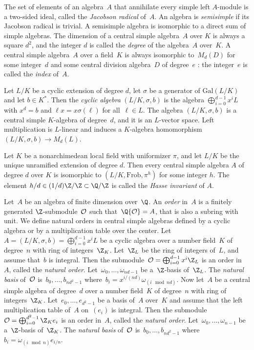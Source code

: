 \par The set of elements of an algebra~$A$ that annihilate every simple left
$A$-module is a two-sided ideal, called the \emph{Jacobson radical} of~$A$.
An algebra is \emph{semisimple} if its Jacobson radical is trivial. A
semisimple algebra is isomorphic to a direct sum of simple algebras. The
dimension of a central simple algebra~$A$ over $K$ is always a square $d^2$,
and the integer $d$ is called the \emph{degree} of the algebra~$A$ over~$K$.
A central simple algebra~$A$ over a field~$K$ is always isomorphic to~$M_d(D)$
for some integer~$d$ and some central division algebra~$D$ of degree~$e$ : the
integer~$e$ is called the \emph{index} of~$A$.

\par Let $L/K$ be a cyclic extension of degree $d$, let $\sigma$ be a
generator of $\text{Gal}(L/K)$ and let $b\in K^*$. Then the \emph{cyclic
algebra} $(L/K,\sigma,b)$ is the algebra $\bigoplus_{i=0}^{d-1}x^iL$ with
$x^d=b$ and $\ell x=x\sigma(\ell)$ for all~$\ell\in L$. The algebra
$(L/K,\sigma,b)$ is a central simple $K$-algebra of degree~$d$, and it is an
$L$-vector space. Left multiplication is $L$-linear and induces a $K$-algebra
homomorphism $(L/K,\sigma,b)\to M_d(L)$.

\par Let $K$ be a nonarchimedean local field with uniformizer $\pi$, and let
$L/K$ be the unique unramified extension of degree $d$. Then every central
simple algebra $A$ of degree $d$ over $K$ is isomorphic to
$(L/K,\text{Frob},\pi^h)$ for some integer $h$. The element $h/d\in
(1/d)\Z/\Z\subset\Q/\Z$ is called the \emph{Hasse invariant} of $A$.

\par Let~$A$ be an algebra of finite dimension over~$\Q$. An \emph{order}
in~$A$ is a finitely generated $\Z$-submodule~${\cal O}$ such that~$\Q{\cal
O} = A$, that is also a subring with unit. We define natural orders in
central simple algebras defined by a cyclic algebra or by a multiplication
table over the center. Let~$A = (L/K,\sigma,b) = \bigoplus_{i=0}^{d-1}x^iL$
be a cyclic algebra over a number field~$K$ of degree~$n$ with ring of
integers~$\Z_K$. Let~$\Z_L$ be the ring of integers of~$L$, and assume
that~$b$ is integral. Then the submodule~${\cal O} =
\bigoplus_{i=0}^{d-1}x^i\Z_L$ is an order in~$A$, called the \emph{natural
order}. Let~$\omega_0,\dots,\omega_{nd-1}$ be a~$\Z$-basis of~$\Z_L$. The
\emph{natural basis} of~${\cal O}$ is~$b_0,\dots,b_{nd^2-1}$ where~$b_i =
x^{i/(nd)}\omega_{(i \mod nd)}$. Now let~$A$ be a central simple algebra of
degree~$d$ over a number field~$K$ of degree~$n$ with ring of
integers~$\Z_K$. Let~$e_0,\dots,e_{d^2-1}$ be a basis of~$A$ over~$K$ and
assume that the left multiplication table of~$A$ on~$(e_i)$ is integral. Then
the submodule~${\cal O} = \bigoplus_{i=0}^{d^2-1}\Z_K e_i$ is an order
in~$A$, called the \emph{natural order}. Let~$\omega_0,\dots,\omega_{n-1}$ be
a~$\Z$-basis of~$\Z_K$. The \emph{natural basis} of~${\cal O}$
is~$b_0,\dots,b_{nd^2-1}$ where~$b_i = \omega_{(i \mod n)}e_{i/n}$.

